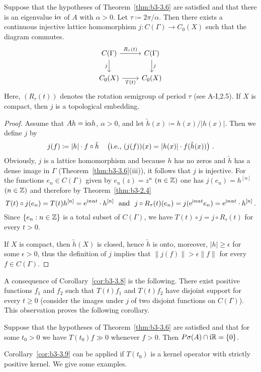 \begin{corollary}\label{cor:b3-3.8}%
Suppose that the hypotheses of Theorem~\ref{thm:b3-3.6} are satisfied and that there is an eigenvalue $\mathrm{i} \alpha$ of $A$ with $\alpha > 0$.
Let $\tau \coloneq 2\pi/\alpha$.
Then there exists a continuous injective lattice homomorphism $j : C(\Gamma) \to C_{0}(X)$ such that the diagram commutes. 
\[
\begin{tikzcd}
C(\Gamma) \arrow[r, "R_{\tau}(t)"] \arrow[d, "j"'] & C(\Gamma) \arrow[d, "j"] \\
C_{0}(X) \arrow[r, "T(t)"'] & C_{0}(X)
\end{tikzcd}
\]
Here, $(R_{\tau}(t))$ denotes the rotation semigroup of period $\tau$ (see A-I,2.5).
If $X$ is compact, then $j$ is a topological embedding.
\end{corollary}
\begin{proof}
	Assume that $Ah = \mathrm{i}\alpha h$, $\alpha > 0$, and let $\tilde{h}(x) \coloneq h(x)/|h(x)|$.
	Then we define $j$ by
	\begin{equation}\label{eq:b3-3.9}
	j(f) \coloneq |h|\cdot f\circ\tilde{h} \quad \left(\text{\ie\ }(j(f))(x) = |h(x)|\cdot f(\tilde{h}(x))\right)\,.
	\end{equation}
	Obviously, $j$ is a lattice homomorphism and because $h$ has no zeros and $\tilde{h}$ has a dense image in $\Gamma$ (Theorem~\ref{thm:b3-3.6}(iii)), it follows that $j$ is injective.
	For the functions $e_{n} \in C(\Gamma)$ given by $e_{n}(z) = z^{n}$ $(n \in \mathbb{Z})$ one has $j(e_{n}) = h^{[n]}$ $(n \in \mathbb{Z})$ and therefore by Theorem~\ref{thm:b3-2.4}
    \[ 
    T(t)\circ j(e_{n}) = T(t)h^{[n]} = \mathrm{e}^{\im n\alpha t}\cdot h^{[n]} 
    \ \text{ and } \ 
    j\circ R_{\tau}(t)(e_{n}) = j(\mathrm{e}^{\im n\alpha t}e_{n}) = \mathrm{e}^{\im n\alpha t}\cdot h^{[n]}\,.
    \]
    Since $\{e_{n} : n \in \mathbb{Z}\}$ is a total subset of $C(\Gamma)$, we have $T(t)\circ j = j\circ R_{\tau}(t)$ for every $t > 0$.
	
	If $X$ is compact, then $\tilde{h}(X)$ is closed, hence $\tilde{h}$ is onto, moreover, $|h| \geq \epsilon$ for some $\epsilon > 0$, thus the definition of $j$ implies that $\|j(f)\| > \epsilon\|f\|$ for every $f \in C(\Gamma)$.
\end{proof}
A consequence of Corollary~\ref{cor:b3-3.8} is the following. 
There exist positive functions $f_{1}$ and $f_{2}$ such that $T(t)f_{1}$ and $T(t)f_{2}$ have disjoint support for every $t \geq 0$ (consider the images under $j$ of two disjoint functions on $C(\Gamma)$).
This observation proves the following corollary.
\begin{corollary}\label{cor:b3-3.9}
	Suppose that the hypotheses of Theorem~\ref{thm:b3-3.6} are satisfied and that for some $t_{0} > 0$ we have $T(t_{0})f \gg 0$ whenever $f > 0$.
	Then $P\sigma(A)\cap \mathrm{i}\mathbb{R} = \{0\}$.
\end{corollary}
Corollary~\ref{cor:b3-3.9} can be applied if $T(t_{0})$ is a kernel operator with strictly positive kernel.
We give some examples.

